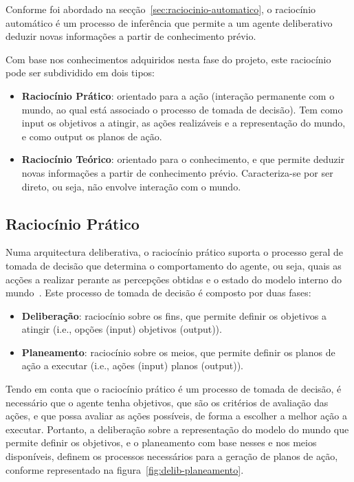 Conforme foi abordado na secção~\ref{sec:raciocinio-automatico}, o raciocínio automático é um processo de inferência que permite a um agente deliberativo deduzir novas informações a partir de conhecimento prévio.

Com base nos conhecimentos adquiridos nesta fase do projeto, este raciocínio pode ser subdividido em dois tipos:

\begin{itemize}
    \item \textbf{Raciocínio Prático}: orientado para a ação (interação permanente com o mundo, ao qual está associado o processo de tomada de decisão).
    Tem como input os objetivos a atingir, as ações realizáveis e a representação do mundo, e como output os planos de ação.
    \item \textbf{Raciocínio Teórico}: orientado para o conhecimento, e que permite deduzir novas informações a partir de conhecimento prévio.
    Caracteriza-se por ser direto, ou seja, não envolve interação com o mundo.
\end{itemize}

\subsection{Raciocínio Prático}\label{subsec:raciocinio-pratico}

Numa arquitectura deliberativa, o raciocínio prático suporta o processo
geral de tomada de decisão que determina o comportamento do agente,
ou seja, quais as acções a realizar perante as percepções obtidas e o
estado do modelo interno do mundo~\cite{isel:iasa:slides:arq-agentes-deliberativos}.
Este processo de tomada de decisão é composto por duas fases:

\begin{itemize}
    \item \textbf{Deliberação}: raciocínio sobre os fins, que permite definir os objetivos a atingir (i.e., opções (input) \rightarrow objetivos (output)).
    \item \textbf{Planeamento}: raciocínio sobre os meios, que permite definir os planos de ação a executar (i.e., ações (input) \rightarrow planos (output)).
\end{itemize}

Tendo em conta que o raciocínio prático é um processo de tomada de decisão, é necessário que o agente tenha objetivos, que são os critérios de avaliação das ações, e que possa avaliar as ações possíveis, de forma a escolher a melhor ação a executar.
Portanto, a deliberação sobre a representação do modelo do mundo que permite definir os objetivos, e o planeamento com base nesses e nos meios disponíveis, definem os processos necessários para a geração de planos de ação, conforme representado na figura~\ref{fig:delib-planeamento}.

